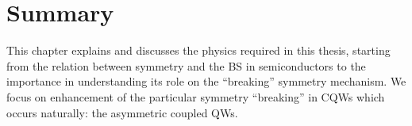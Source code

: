 \section{Summary}
\label{sec:chapter-2-summary}
\vspace{-10mm} 
This chapter explains and discusses the physics required in this thesis, starting from
the relation between symmetry and the BS in semiconductors to the importance in understanding its role on the “breaking” symmetry mechanism. We focus on enhancement of the particular symmetry ``breaking'' in \gls{CQWs} which occurs naturally: the asymmetric coupled QWs.